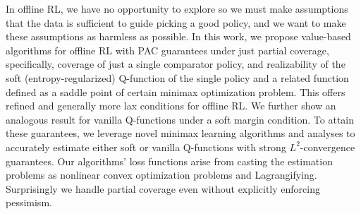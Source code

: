 In offline RL, we have no opportunity to explore so we must make assumptions that the data is sufficient to guide picking a good policy, and we want to make these assumptions as harmless as possible.
In this work, we propose value-based algorithms for offline RL with PAC guarantees under just partial coverage, specifically, coverage of just a single comparator policy, and realizability of the soft (entropy-regularized) Q-function of the single policy and a related function defined as a saddle point of certain minimax optimization problem. This offers refined and generally more lax conditions for offline RL. We further show an analogous result for vanilla Q-functions under a soft margin condition. To attain these guarantees, we leverage novel minimax learning algorithms and analyses to accurately estimate either soft or vanilla Q-functions with strong $L^2$-convergence guarantees. Our algorithms' loss functions arise from casting the estimation problems as nonlinear convex optimization problems and Lagrangifying. Surprisingly we handle partial coverage even without explicitly enforcing pessimism.